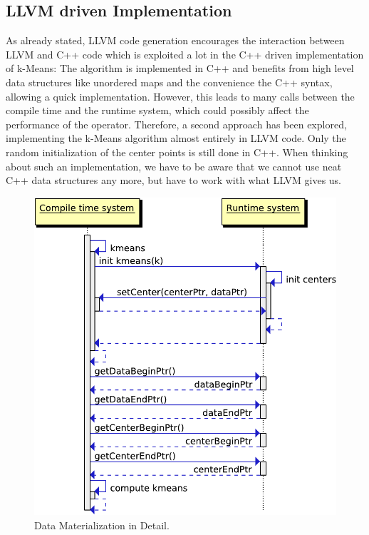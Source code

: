 \subsection{LLVM driven Implementation}

As already stated, LLVM code generation encourages the interaction between LLVM and C++ code which is exploited a lot in the C++ driven implementation of k-Means: The algorithm is implemented in C++ and benefits from high level data structures like unordered maps and the convenience the C++ syntax, allowing a quick implementation. 
However, this leads to many calls between the compile time and the runtime system, which could possibly affect the performance of the operator. Therefore, a second approach has been explored, implementing the k-Means algorithm almost entirely in LLVM code. Only the random initialization of the center points is still done in C++. When thinking about such an implementation, we have to be aware that we cannot use neat C++ data structures any more, but have to work with what LLVM gives us.

\begin{figure}[htsb]
  \centering
  \includegraphics[scale=0.4]{figures/llvm_driven}
  \caption[Data Materialization in Detail]{Data Materialization in Detail.}
  \label{fig:llvm_driven}
\end{figure}

